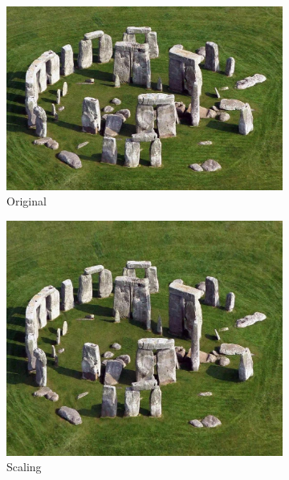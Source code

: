 \documentclass[final]{cvpr}
\begin{document}
\begin{figure}[htb]
\begin{center}
\begin{subfigure}[b]{0.70\linewidth}
    \includegraphics[width=\textwidth]{stonehenge.jpg}
    \caption{Original}
\end{subfigure}
\begin{subfigure}[b]{0.40\linewidth}
    \includegraphics[width=\textwidth]{stonehenge_enlarge.jpg}
    \caption{Scaling}
\end{subfigure}
\begin{subfigure}[b]{0.40\linewidth}

\end{subfigure}
\end{center}
\end{figure}
\end{document}
